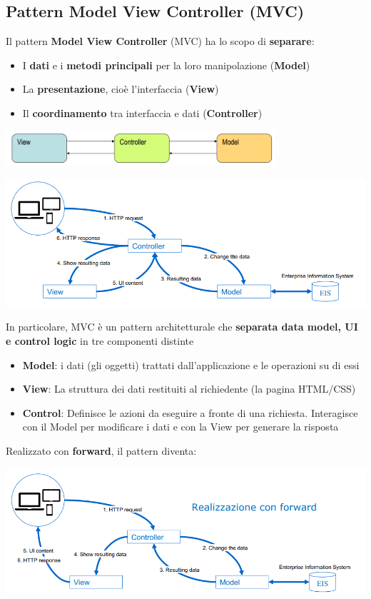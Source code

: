 \documentclass[12pt]{article}
\begin{document}
\subsection{Pattern Model View Controller (MVC)}
Il pattern \textbf{Model View Controller} (MVC) ha lo scopo di \textbf{separare}:
\begin{itemize}
    \item I \textbf{dati} e i \textbf{metodi principali} per la loro manipolazione (\textbf{Model})
    \item La \textbf{presentazione}, cioè l'interfaccia (\textbf{View})
    \item Il \textbf{coordinamento} tra interfaccia e dati (\textbf{Controller})
\end{itemize}
\begin{center}
    \includegraphics[width = 0.75\textwidth]{Images/210.png}
\end{center}
\begin{center}
    \includegraphics[width = 1\textwidth]{Images/211.png}
\end{center}
In particolare, MVC è un pattern architetturale che \textbf{separata data model, UI e control logic} in tre componenti distinte
\begin{itemize}
    \item \textbf{Model}: i dati (gli oggetti) trattati dall'applicazione e le operazioni su di essi
    \item \textbf{View}: La struttura dei dati restituiti al richiedente (la pagina HTML/CSS)
    \item \textbf{Control}: Definisce le azioni da eseguire a fronte di una richiesta. Interagisce con il Model per modificare i dati e con la View per generare la risposta
\end{itemize}
Realizzato con \textbf{forward}, il pattern diventa:
\begin{center}
    \includegraphics[width = 1\textwidth]{Images/212.png}
\end{center}
\end{document}
